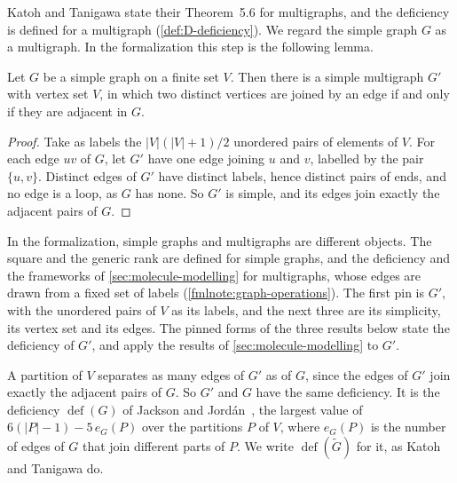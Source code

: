 Katoh and Tanigawa state their Theorem~5.6 for multigraphs, and the
deficiency is defined for a multigraph (\cref{def:D-deficiency}). We
regard the simple graph $G$ as a multigraph. In the formalization this
step is the following lemma.

\begin{lemma}
  \label{lem:molecule-graph-carrier}
  \leanok
  Let $G$ be a simple graph on a finite set $V$. Then there is a simple
  multigraph $G'$ with vertex set $V$, in which two distinct vertices are
  joined by an edge if and only if they are adjacent in $G$.
\end{lemma}
\begin{proof}
  \leanok
  Take as labels the $|V|(|V| + 1)/2$ unordered pairs of elements of
  $V$. For each edge $uv$ of $G$, let $G'$ have one edge joining $u$ and
  $v$, labelled by the pair $\{u, v\}$. Distinct edges of $G'$ have
  distinct labels, hence distinct pairs of ends, and no edge is a loop,
  as $G$ has none. So $G'$ is simple, and its edges join exactly the
  adjacent pairs of $G$.
\end{proof}

\begin{fmlnote}
  In the formalization, simple graphs and multigraphs are different
  objects. The square and the generic rank are defined for simple graphs,
  and the deficiency and the frameworks of \cref{sec:molecule-modelling}
  for multigraphs, whose edges are drawn from a fixed set of labels
  (\cref{fmlnote:graph-operations}). The first pin is $G'$, with the
  unordered pairs of $V$ as its labels, and the next three are its
  simplicity, its vertex set and its edges. The pinned forms of the three results below
  state the deficiency of $G'$, and apply the results of
  \cref{sec:molecule-modelling} to $G'$.
\end{fmlnote}

A partition of $V$ separates as many edges of $G'$ as of $G$, since the
edges of $G'$ join exactly the adjacent pairs of $G$. So $G'$ and $G$
have the same deficiency. It is the deficiency $\operatorname{def}(G)$ of
Jackson and Jord\'an~\cite[\S2]{jacksonJordan2008}, the largest value of
$6(|P| - 1) - 5\,e_G(P)$ over the partitions $P$ of $V$, where $e_G(P)$
is the number of edges of $G$ that join different parts of $P$. We write
$\operatorname{def}(\tilde G)$ for it, as Katoh and Tanigawa do.

